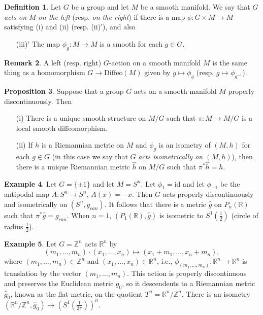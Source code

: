 \documentclass{amsart}
\numberwithin{equation}{section}
\newcommand{\bR}{\mathbb{R}}
\newcommand{\bZ}{\mathbb{Z}}
\theoremstyle{definition}
\newtheorem{definition}{Definition} [section]
\newtheorem{example}[definition]{Example}
\newtheorem{remark}[definition]{Remark}
\theoremstyle{theorem}
\newtheorem{proposition}[definition]{Proposition}
\begin{document}
\begin{definition}
Let $G$ be a group and let $M$ be a smooth manifold. We say that {\em $G$ acts on $M$ on the left} (resp. {\em on the right}) 
if there is a map $\phi : G \times M \to M$ satisfying (i) and (ii) (resp. (ii)'), and also
\begin{enumerate}
 \item[(iii)'] The map $\phi_g : M \to M$ is a smooth for each $g \in G$.
\end{enumerate} 
\end{definition}

\begin{remark}
A left (resp. right) $G$-action on a smooth manifold $M$
is the same thing as a homomorphism $G \to \text{Diffeo}(M)$ given by 
$g\mapsto \phi_g$ (resp. $g\mapsto \phi_{g^{-1}}$). 
\end{remark}

\begin{proposition}
Suppose that a group $G$ acts on a smooth manifold $M$ properly discontinuously. Then 
\begin{enumerate}
\item[(i)] There is a unique smooth structure on $M/G$ such that $\pi : M \to M/G$ is a local smooth diffeomorphism. 
\item[(ii)] If $h$ is a Riemannian metric on $M$ and $\phi_g$ is an isometry of $(M,h)$ for each $g\in G$ (in this case we say that $G$ 
{\em acts isometrically on $(M,h)$}), then there is a unique Riemannian metric $\hat{h}$ on $M/G$ such that $\pi^*\hat{h} = h$. 
\end{enumerate}
\end{proposition}

\begin{example}
Let $G = \{\pm1\}$ and let $M = S^n$. Let $\phi_1 = \text{id}$ and let $\phi_{-1}$ be the antipodal map $A:S^n\to S^n$,
$A(x)=-x$.  Then $G$ acts properly discontinuously and isometrically on $(S^n, g_{can})$. It follows that there is a metric 
$\hat{g}$ on $P_n(\bR)$ such that $\pi^* \hat{g} = g_{can}$.  When $n=1$,  $(P_1(\bR),\hat{g})$ is isometric
to $S^1(\frac{1}{2})$ (circle of radius $\frac{1}{2}$). 
\end{example}

\begin{example}
Let $G=\bZ^n$ acts $\bR^n$ by 
\[
(m_1, \ldots, m_n) \cdot (x_1, \ldots, x_n) \mapsto (x_1 + m_1, \ldots, x_n + m_n),
\]
where $(m_1,\ldots,m_n)\in \bZ^n$ and $(x_1,\ldots,x_n)\in \bR^n$, i.e., 
$\phi_{(m_1,\ldots,m_n)}:\bR^n\to \bR^n$ is translation by the vector $(m_1,\ldots,m_n)$.
This action is properly discontinuous and preserves the Euclidean metric $g_0$, so it
descendents to a Riemannian metric $\hat{g}_0$, known as the flat metric, on
the quotient $T^n=\bR^n/\bZ^n$.  
There is an isometry $(\mathbb{R}^n/ \mathbb{Z}^n, \hat{g}_0) \to (S^1(\frac{1}{2\pi}))^n$. 
\end{example}
\end{document}
